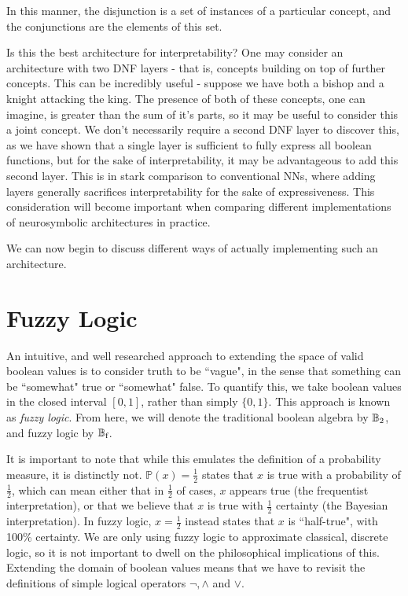 In this manner, the disjunction is a set of instances of a particular concept, and the conjunctions are the elements of this set.

Is this the best architecture for interpretability? One may consider an architecture with two DNF layers - that is, concepts building on top of further concepts. This can be incredibly useful - suppose we have both a bishop and a knight attacking the king. The presence of both of these concepts, one can imagine, is greater than the sum of it's parts, so it may be useful to consider this a joint concept. We don't necessarily require a second DNF layer to discover this, as we have shown that a single layer is sufficient to fully express all boolean functions, but for the sake of interpretability, it may be advantageous to add this second layer. This is in stark comparison to conventional NNs, where adding layers generally sacrifices interpretability for the sake of expressiveness. This consideration will become important when comparing different implementations of neurosymbolic architectures in practice.

We can now begin to discuss different ways of actually implementing such an architecture.

\section{Fuzzy Logic}

\def\Bf{\B_\text{f}}

An intuitive, and well researched approach to extending the space of valid boolean values is to consider truth to be ``vague", in the sense that something can be ``somewhat" true or ``somewhat" false. To quantify this, we take boolean values in the closed interval $[0,1]$, rather than simply $\{0,1\}$. This approach is known as \textit{fuzzy logic}.  From here, we will denote the traditional boolean algebra by $\mathbb{B}_2$, and fuzzy logic by $\Bf$. 

It is important to note that while this emulates the definition of a probability measure, it is distinctly not. $\mathbb{P}(x) = \frac{1}{2}$ states that $x$ is true with a probability of $\frac{1}{2}$, which can mean either that in $\frac{1}{2}$ of cases, $x$ appears true (the frequentist interpretation), or that we believe that $x$ is true with $\frac{1}{2}$ certainty (the Bayesian interpretation). In fuzzy logic, $x = \frac{1}{2}$ instead states that $x$ is ``half-true", with 100\% certainty. We are only using fuzzy logic to approximate classical, discrete logic, so it is not important to dwell on the philosophical implications of this. Extending the domain of boolean values means that we have to revisit the definitions of simple logical operators $\lnot, \land$ and $\lor$.

